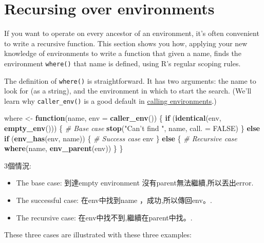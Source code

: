 \documentclass[]{book}
\newenvironment{Shaded}{\begin{snugshade}}{\end{snugshade}}
\newcommand{\CommentTok}[1]{\textcolor[rgb]{0.56,0.35,0.01}{\textit{#1}}}
\newcommand{\ControlFlowTok}[1]{\textcolor[rgb]{0.13,0.29,0.53}{\textbf{#1}}}
\newcommand{\DataTypeTok}[1]{\textcolor[rgb]{0.13,0.29,0.53}{#1}}
\newcommand{\KeywordTok}[1]{\textcolor[rgb]{0.13,0.29,0.53}{\textbf{#1}}}
\newcommand{\NormalTok}[1]{#1}
\newcommand{\OtherTok}[1]{\textcolor[rgb]{0.56,0.35,0.01}{#1}}
\newcommand{\StringTok}[1]{\textcolor[rgb]{0.31,0.60,0.02}{#1}}
\theoremstyle{definition}
\theoremstyle{definition}
\theoremstyle{definition}
\theoremstyle{remark}
\begin{document}
\hypertarget{env-recursion}{%
\section{Recursing over environments}\label{env-recursion}}

If you want to operate on every ancestor of an environment, it's often
convenient to write a recursive function. This section shows you how,
applying your new knowledge of environments to write a function that
given a name, finds the environment \texttt{where()} that name is
defined, using R's regular scoping rules.

The definition of \texttt{where()} is straightforward. It has two
arguments: the name to look for (as a string), and the environment in
which to start the search. (We'll learn why \texttt{caller\_env()} is a
good default in \protect\hyperlink{calling-environments}{calling
environments}.)

\begin{Shaded}
\begin{Highlighting}[]
\NormalTok{where <-}\StringTok{ }\ControlFlowTok{function}\NormalTok{(name, }\DataTypeTok{env =} \KeywordTok{caller_env}\NormalTok{()) \{}
  \ControlFlowTok{if}\NormalTok{ (}\KeywordTok{identical}\NormalTok{(env, }\KeywordTok{empty_env}\NormalTok{())) \{}
    \CommentTok{# Base case}
    \KeywordTok{stop}\NormalTok{(}\StringTok{"Can't find "}\NormalTok{, name, }\DataTypeTok{call. =} \OtherTok{FALSE}\NormalTok{)}
\NormalTok{  \} }\ControlFlowTok{else} \ControlFlowTok{if}\NormalTok{ (}\KeywordTok{env_has}\NormalTok{(env, name)) \{}
    \CommentTok{# Success case}
\NormalTok{    env}
\NormalTok{  \} }\ControlFlowTok{else}\NormalTok{ \{}
    \CommentTok{# Recursive case}
    \KeywordTok{where}\NormalTok{(name, }\KeywordTok{env_parent}\NormalTok{(env))}
\NormalTok{  \}}
\NormalTok{\}}
\end{Highlighting}
\end{Shaded}

3個情況:

\begin{itemize}
\item
  The base case: 到達empty environment 沒有parent無法繼續,所以丟出error.
\item
  The successful case: 在env中找到name ，成功,所以傳回env。.
\item
  The recursive case: 在env中找不到,繼續在parent中找。.
\end{itemize}

These three cases are illustrated with these three examples:
\end{document}
